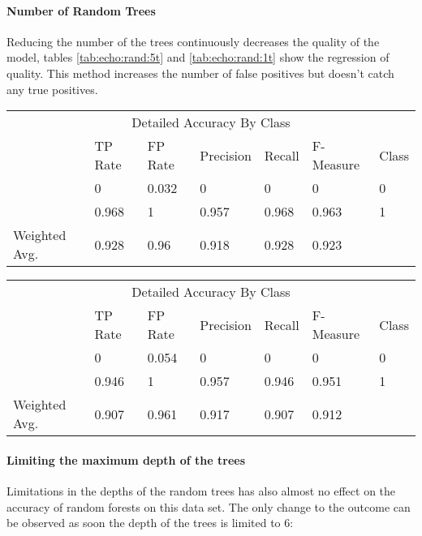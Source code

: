 \documentclass[paper=a4, fontsize=11pt]{scrartcl} %
\numberwithin{equation}{section} %
\numberwithin{figure}{section} %
\numberwithin{table}{section} %
\begin{document}
\paragraph{Number of Random Trees}
Reducing the number of the trees continuously decreases the quality of the model, tables \ref{tab:echo:rand:5t} and \ref{tab:echo:rand:1t} show the regression of quality.
This method increases the number of false positives but doesn't catch any true positives.
\begin{table*}[htb]\centering
    \begin{tabular*}{\columnwidth}{@{}lllllll@{}}
        \toprule 
        \multicolumn{7}{c}{Detailed Accuracy By Class} \\ 
               &  TP Rate & FP Rate & Precision & Recall & F-Measure &   Class  \\ \midrule
               &  0       & 0.032   & 0         & 0      & 0         &   0      \\
               &  0.968   & 1       & 0.957     & 0.968  & 0.963     &   1      \\     
Weighted Avg.  &  0.928   & 0.96    & 0.918     & 0.928  & 0.923     &          \\ \bottomrule
    \end{tabular*}
\caption{Random Forest -- 5 Random Trees} 
\label{tab:echo:rand:5t}
\end{table*}
\FloatBarrier

\begin{table*}[htb]\centering
    \begin{tabular*}{\columnwidth}{@{}lllllll@{}}
        \toprule 
        \multicolumn{7}{c}{Detailed Accuracy By Class} \\ 
               &  TP Rate & FP Rate & Precision & Recall & F-Measure &   Class \\ \midrule
               &  0       & 0.054   & 0         & 0      & 0         &   0     \\ 
               &  0.946   & 1       & 0.957     & 0.946  & 0.951     &   1     \\ 
Weighted Avg.  &  0.907   & 0.961   & 0.917     & 0.907  & 0.912     &         \\ \bottomrule
    \end{tabular*}
\caption{Random Forest -- 1 Random Tree} 
\label{tab:echo:rand:1t}
\end{table*}
\FloatBarrier
\paragraph{Limiting the maximum depth of the trees}
Limitations in the depths of the random trees has also almost no effect on the accuracy of random forests on this data set. The only change to the outcome can be observed as soon the depth of the trees is limited to 6:
\end{document}
